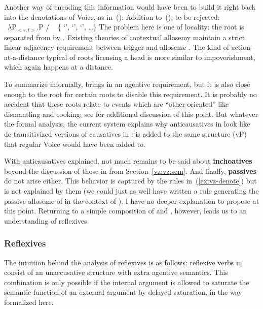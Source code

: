 Another way of encoding this information would have been to build it right back into the denotations of Voice, as in~(\nextx):
\ex Addition to~(\blastx), to be rejected:\\
	\denote{\vz} \lra~$\lambda$P$_{<s,t>}$.P / \trace~{\va} \{ `',  `',  `', \dots\}
\xe
The problem here is one of locality: the root is separated from {\vz} by {\va}. Existing theories of contextual allosemy maintain a strict linear adjacency requirement between trigger and alloseme \citep{marantz13,kastner16phd}. The kind of action-at-a-distance typical of roots licensing a head is more similar to impoverishment, which again happens at a distance.

To summarize informally, {\va} brings in an agentive requirement, but it is also close enough to the root for certain roots to disable this requirement. It is probably no accident that these roots relate to events which are ``other-oriented'' like dismantling and cooking; see \cite{kastner17gjgl} for additional discussion of this point. But whatever the formal analysis, the current system explains why anticausatives in {\thit} look like de-transitivized versions of causatives in {\tpie}: {\vz} is added to the same structure (vP) that regular Voice would have been added to.

With anticausatives explained, not much remains to be said about \textbf{inchoatives} beyond the discussion of those in {\tnif} from Section~\ref{vz:vz:sem}. And finally, \textbf{passives} do not arise either. This behavior is captured by the rules in~(\ref{ex:vz-denote}) but is not explained by them (we could just as well have written a rule generating the passive alloseme of {\vz} in the context of {\va}). I have no deeper explanation to propose at this point. Returning to a simple composition of {\vz} and {\va}, however, leads us to an understanding of reflexives.

		\subsubsection{Reflexives} \label{vz:va:vzva:refl}
The intuition behind the analysis of reflexives is as follows: reflexive verbs in {\thit} consist of an unaccusative structure with extra agentive semantics. This combination is only possible if the internal argument is allowed to saturate the semantic function of an external argument by delayed saturation, in the way formalized here.

